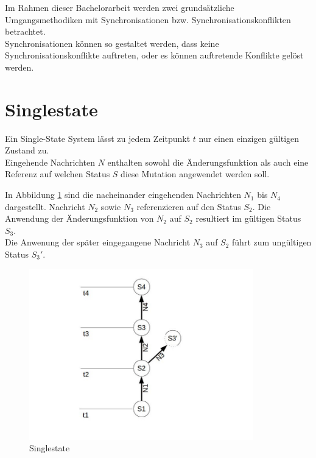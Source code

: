 \documentclass[oneside,11pt,parskip=half,ngerman]{scrreprt}
\makeatletter
\def\maxwidth{\ifdim\Gin@nat@width>\linewidth\linewidth
\else\Gin@nat@width\fi}
\let\Oldincludegraphics\includegraphics
\renewcommand{\includegraphics}[1]{\Oldincludegraphics[width=\maxwidth,height=20em,keepaspectratio]{#1}}
\makeatother
\begin{document}

Im Rahmen dieser Bachelorarbeit werden zwei grundsätzliche
Umgangsmethodiken mit Synchronisationen bzw. Synchronisationskonflikten
betrachtet.\\Synchronisationen können so gestaltet werden, dass keine
Synchronisationskonflikte auftreten, oder es können auftretende
Konflikte gelöst werden.\\

\newpage

\section{Singlestate}\label{singlestate}

Ein Single-State System lässt zu jedem Zeitpunkt \(t\) nur einen
einzigen gültigen Zustand zu.\\Eingehende Nachrichten \(N\) enthalten
sowohl die Änderungsfunktion als auch eine Referenz auf welchen Status
\(S\) diese Mutation angewendet werden soll.

In Abbildung \ref{fig:singlestate} sind die nacheinander eingehenden
Nachrichten \(N_1\) bis \(N_4\) dargestellt. Nachricht \(N_2\) sowie
\(N_3\) referenzieren auf den Status \(S_2\). Die Anwendung der
Änderungsfunktion von \(N_2\) auf \(S_2\) resultiert im gültigen Status
\(S_3\).\\Die Anwenung der später eingegangene Nachricht \(N_3\) auf
\(S_2\) führt zum ungültigen Status \(S_3'\).

\begin{figure}[htbp]
\centering
\includegraphics{img/singlestate.jpg}
\caption{Singlestate\label{fig:singlestate}}
\end{figure}
\end{document}
